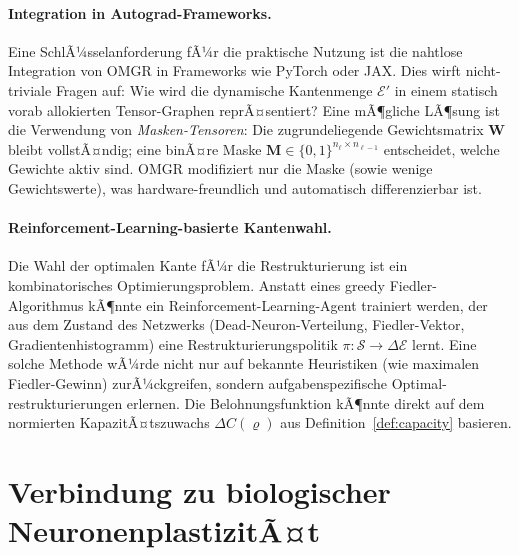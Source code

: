 ﻿\documentclass[12pt, a4paper, openany]{report}
\newcommand{\calE}{\mathcal{E}}
\begin{document}
\paragraph{Integration in Autograd-Frameworks.}
Eine SchlÃ¼sselanforderung fÃ¼r die praktische Nutzung ist die nahtlose
Integration von OMGR in Frameworks wie PyTorch oder JAX.  Dies wirft
nicht-triviale Fragen auf: Wie wird die dynamische Kantenmenge $\calE'$
in einem statisch vorab allokierten Tensor-Graphen reprÃ¤sentiert?
Eine mÃ¶gliche LÃ¶sung ist die Verwendung von \emph{Masken-Tensoren}: Die
zugrundeliegende Gewichtsmatrix $\bm{W}$ bleibt vollstÃ¤ndig; eine binÃ¤re
Maske $\bm{M} \in \{0,1\}^{n_\ell \times n_{\ell-1}}$ entscheidet, welche
Gewichte aktiv sind.  OMGR modifiziert nur die Maske (sowie wenige
Gewichtswerte), was hardware-freundlich und automatisch differenzierbar ist.

\paragraph{Reinforcement-Learning-basierte Kantenwahl.}
Die Wahl der optimalen Kante fÃ¼r die Restrukturierung ist ein kombinatorisches
Optimierungsproblem.  Anstatt eines greedy Fiedler-Algorithmus kÃ¶nnte ein
Reinforcement-Learning-Agent trainiert werden, der aus dem Zustand des
Netzwerks (Dead-Neuron-Verteilung, Fiedler-Vektor, Gradientenhistogramm)
eine Restrukturierungspolitik $\pi : \mathcal{S} \to \Delta\calE$ lernt.
Eine solche Methode wÃ¼rde nicht nur auf bekannte Heuristiken (wie maximalen
Fiedler-Gewinn) zurÃ¼ckgreifen, sondern aufgabenspezifische Optimal-
restrukturierungen erlernen.  Die Belohnungsfunktion kÃ¶nnte direkt auf
dem normierten KapazitÃ¤tszuwachs $\Delta C(\varrho)$ aus Definition~\ref{def:capacity}
basieren.

\section{Verbindung zu biologischer NeuronenplastizitÃ¤t}
\label{sec:outlook_bio}
\end{document}
